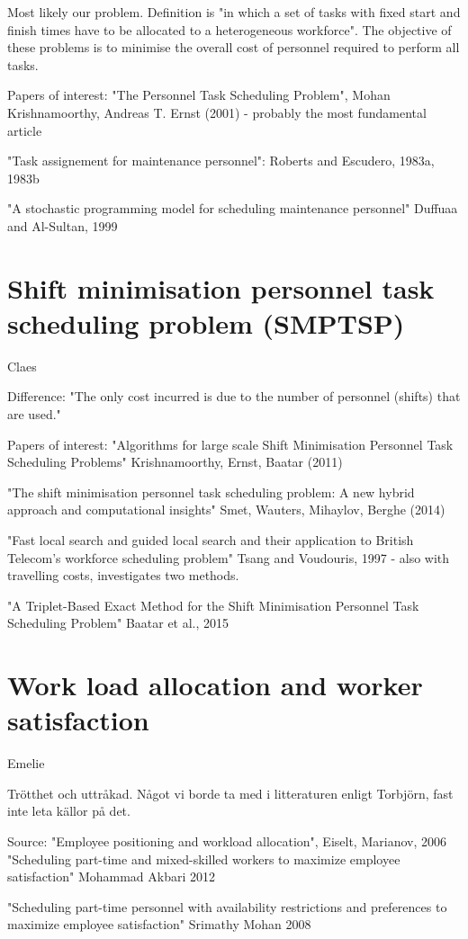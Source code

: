 Most likely our problem. Definition is "in which a set of tasks with fixed start and finish times have to be allocated to a heterogeneous workforce". The objective of these problems is to minimise the overall cost of personnel required to perform all tasks.

Papers of interest:
"The Personnel Task Scheduling Problem", Mohan Krishnamoorthy, Andreas T. Ernst (2001) - probably the most fundamental article

"Task assignement for maintenance personnel": Roberts and Escudero, 1983a, 1983b

"A stochastic programming model for scheduling maintenance personnel" Duffuaa and Al-Sultan, 1999

\section{Shift minimisation personnel task scheduling problem (SMPTSP)}\label{SMTSP}
Claes

Difference: "The only cost incurred is due to the number of personnel (shifts) that are used."

Papers of interest:
"Algorithms for large scale Shift Minimisation Personnel Task Scheduling Problems" Krishnamoorthy, Ernst, Baatar (2011)

"The shift minimisation personnel task scheduling problem: A new hybrid approach and computational insights" Smet, Wauters, Mihaylov, Berghe (2014)

"Fast local search and guided local search and their application to British Telecom's workforce scheduling problem" Tsang and Voudouris, 1997 - also with travelling costs, investigates two methods.

"A Triplet-Based Exact Method for the Shift Minimisation Personnel Task Scheduling Problem" Baatar et al., 2015

\section{Work load allocation and worker satisfaction} \label{WLA}
Emelie

Trötthet och uttråkad. Något vi borde ta med i litteraturen enligt Torbjörn, fast inte leta källor på det.

Source: "Employee positioning and workload allocation", Eiselt, Marianov, 2006
"Scheduling part-time and mixed-skilled workers to maximize employee satisfaction" Mohammad Akbari 2012

"Scheduling part-time personnel with availability restrictions and preferences to maximize employee satisfaction" Srimathy Mohan 2008

